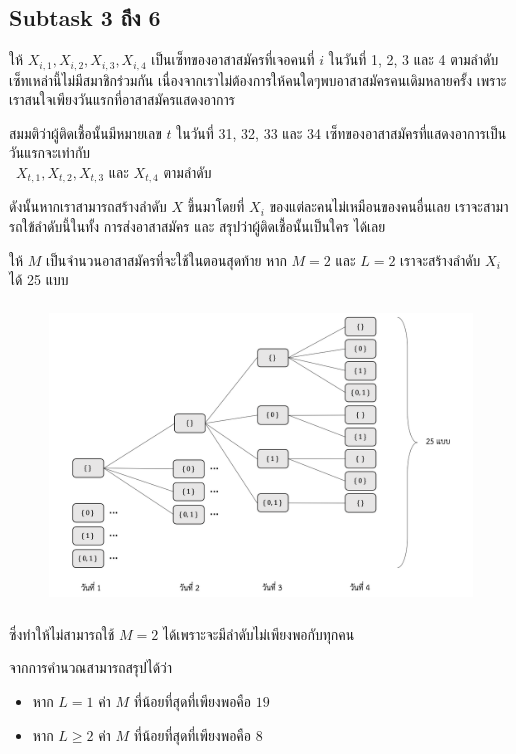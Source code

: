 \documentclass[12pt]{article}
\begin{document}
\subsection{Subtask 3 ถึง 6}

ให้ $X_{i,1}, X_{i,2}, X_{i,3}, X_{i,4}$ เป็นเซ็ทของอาสาสมัครที่เจอคนที่ $i$ ในวันที่ 1, 2, 3 และ 4 ตามลำดับ เซ็ทเหล่านี้ไม่มีสมาชิกร่วมกัน เนื่องจากเราไม่ต้องการให้คนใดๆพบอาสาสมัครคนเดิมหลายครั้ง เพราะเราสนใจเพียงวันแรกที่อาสาสมัครแสดงอาการ

สมมติว่าผู้ติดเชื้อนั้นมีหมายเลข $t$ ในวันที่ 31, 32, 33 และ 34 เซ็ทของอาสาสมัครที่แสดงอาการเป็นวันแรกจะเท่ากับ \\\ $X_{t,1}, X_{t,2}, X_{t,3}$ และ $X_{t,4}$ ตามลำดับ

ดังนั้นหากเราสามารถสร้างลำดับ $X$ ขึ้นมาโดยที่ $X_i$ ของแต่ละคนไม่เหมือนของคนอื่นเลย เราจะสามารถใข้ลำดับนี้ในทั้ง การส่งอาสาสมัคร และ สรุปว่าผู้ติดเชื้อนั้นเป็นใคร ได้เลย

ให้ $M$ เป็นจำนวนอาสาสมัครที่จะใช้ในตอนสุดท้าย หาก $M = 2$ และ $L = 2$ เราจะสร้างลำดับ $X_i$ ได้ 25 แบบ

\begin{figure}[h]
  \centering
  \includegraphics[height=8cm]{./images/pandemic1.png}
\end{figure}

ซึ่งทำให้ไม่สามารถใช้ $M = 2$ ได้เพราะจะมีลำดับไม่เพียงพอกับทุกคน

จากการคำนวณสามารถสรุปได้ว่า

\begin{itemize}
  \item หาก $L = 1$ ค่า $M$ ที่น้อยที่สุดที่เพียงพอคือ $19$
  \item หาก $L \geq 2$ ค่า $M$ ที่น้อยที่สุดที่เพียงพอคือ $8$
\end{itemize}
\end{document}
